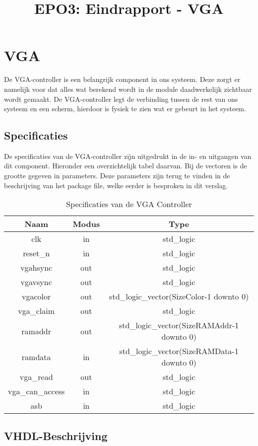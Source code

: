 \documentclass{scrartcl} %
\author{}
\title{EPO3: Eindrapport - VGA}
\begin{document}
\chapter{VGA}
\label{ch:vga}

De VGA-controller is een belangrijk component in ons systeem. Deze zorgt er namelijk voor dat alles wat berekend wordt in de module daadwerkelijk zichtbaar wordt gemaakt. De VGA-controller legt de verbinding tussen de rest van ons systeem en een scherm, hierdoor is fysiek te zien wat er gebeurt in het systeem. 

\section{Specificaties}

De specificaties van de VGA-controller zijn uitgedrukt in de in- en uitgangen van dit component. Hieronder een overzichtelijk tabel daarvan. Bij de vectoren is de grootte gegeven in parameters. Deze parameters zijn terug te vinden in de beschrijving van het package file, welke eerder is besproken in dit verslag.

\begin{table}[H]
\centering
\caption{Specificaties van de VGA Controller }
\label{tab:spec-vgacontroller}
\begin{tabular}{c c c}
	\hline\hline
 	Naam & Modus & Type\\
 	\hline	
	clk & in & std\_logic \\ 
	reset\_n & in & std\_logic \\ 
	vgahsync & out & std\_logic \\ 
	vgavsync & out & std\_logic \\ 
	vgacolor & out & std\_logic\_vector(SizeColor-1 downto 0) \\
	vga\_claim & out & std\_logic \\ 
	ramaddr & out & std\_logic\_vector(SizeRAMAddr-1 downto 0) \\
	ramdata & in & std\_logic\_vector(SizeRAMData-1 downto 0) \\ 
	vga\_read & out & std\_logic \\
	vga\_can\_access & in & std\_logic \\
	asb & in & std\_logic \\
  	\hline\hline
\end{tabular}
\end{table}


\section{VHDL-Beschrijving}
\end{document}
